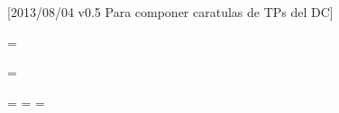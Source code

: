 \usepackage[spanish]{babel}
\usepackage[utf8]{inputenc}
\usepackage{framed}


\newcommand{\comen}[2]{%
\begin{framed}
\noindent \textsf{#1:} #2
\end{framed}
}

%
%
%


[2013/08/04 v0.5 Para componer caratulas de TPs del DC]
\RequirePackage{ifthen}
\usepackage[pdftex]{graphicx}




\let\Materia\relax
\let\Submateria\relax
\let\Titulo\relax
\let\Subtitulo\relax
\let\Grupo\relax
\let\Fecha\relax
\let\Logoimagefile\relax
\newcommand{\LabelIntegrantes}{}


\def\materia#1{\def\Materia{#1}}
\def\submateria#1{\def\Submateria{#1}}
\def\titulo#1{\def\Titulo{#1}}
\def\subtitulo#1{\def\Subtitulo{#1}}
\def\grupo#1{\def\Grupo{#1}}
\def\fecha#1{\def\Fecha{#1}}
\def\logoimagefile#1{\def\Logoimagefile{#1}}


\newtoks\intlist\intlist={}

\newtoks\intlistSinLU\intlistSinLU={}

\setcounter{integrantesCount}{0}
\newtoks\intTabNombre\intTabNombre={}
\newtoks\intTabLU\intTabLU={}
\newtoks\intTabEmail\intTabEmail={}

